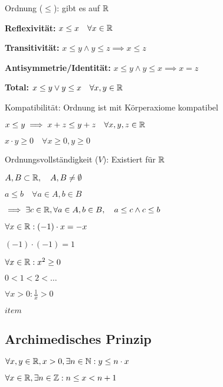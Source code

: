 \begin{compactdesc}
\begin{compactenum}[{D}.1]
        \end{compactenum}
    \item[Ordnung ($\le $):] gibt es auf $\mathbb{R}$
        \begin{compactenum}[{O}.1]
        \item \textbf{Reflexivität:} $x \le x \quad \forall x \in \mathbb{R}$
        \item \textbf{Transitivität:} $x \le y \wedge y \le z \implies x \le z$
        \item \textbf{Antisymmetrie/Identität:} $x \le y \wedge y \le x \implies x = z$
        \item \textbf{Total:} $x \le y \vee y \le x \quad \forall x,y \in \mathbb{R}$
        \end{compactenum}
    \item[Kompatibilität:] Ordnung ist mit Körperaxiome kompatibel
        \begin{compactenum}[{K}.1]
            \item $x \le y \implies x + z \le y + z \quad \forall x,y,z \in \mathbb{R}$
            \item $x \cdot  y \ge 0 \quad \forall x \ge 0, y \ge 0$
        \end{compactenum}
    \item[Ordnungsvollständigkeit ($V$):] Existiert für $\mathbb{R}$
        \begin{compactenum}
            \item $A, B \subset \mathbb{R}, \quad A, B \neq \emptyset$
            \item $a \le  b \quad \forall  a \in  A,b \in B$
        \end{compactenum}
        $\implies \exists c \in  \mathbb{R}, \forall a \in  A, b \in  B, \quad a \le c \wedge c \le b$
\end{compactdesc}

\begin{compactenum}
    \item $\forall x \in \mathbb{R}: (-1) \cdot x = -x$  
    \item $(-1) \cdot  (-1) = 1$
    \item $\forall x \in  \mathbb{R}: x^2 \ge 0$
    \item $0 < 1 < 2 < \ldots$
    \item $\forall x > 0: \frac{1}{x} > 0$
    \item $item$
\end{compactenum}

\subsection{Archimedisches Prinzip}
\begin{compactenum} \item $\forall x,y \in \mathbb{R}, x > 0, \exists n \in \mathbb{N}: y \le n \cdot x$ 
    \item $\forall x \in \mathbb{R}, \exists n \in \mathbb{Z}: n \le x < n + 1$
\end{compactenum}

